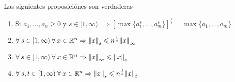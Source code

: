 \begin{lemma} \label{lema21}
    Las siguientes proposiciónes son verdaderas
    \begin{enumerate}
        \item Si $a_1,...,a_n \geqslant 0 $ y $s \in [1,\infty) \implies {[\max \{ {a}_{1}^{s}, ... , {a}_{m}^{s} \}]}^{\frac{1}{s}} = \max \{ {a}_{1}, ..., {a}_{m}\}$ 
        \item $\forall \: s \in [1,\infty) \: \forall \: x \in \mathbb{R}^n \Rightarrow {\norm{x}}_{s} \leqslant {n}^{\frac{1}{s}} {\norm{x}}_{\infty}$
        \item $\forall \: s \in [1,\infty) \: \forall \: x \in \mathbb{R}^n \Rightarrow {\norm{x}}_{\infty} \leqslant {\norm{x}}_{s}$
        \item $\forall \: s, t \in [1,\infty) \: \forall \: x \in \mathbb{R}^n \Rightarrow {\norm{x}}_{s} \leqslant {n}^{\frac{1}{s}} {\norm{x}}_{t}$
    \end{enumerate}
\end{lemma}

